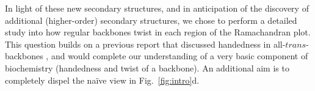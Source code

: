 \documentclass[fleqn,10pt]{wlpeerj} %
\newcommand{\Fig}[1]{Fig.~\ref{#1}}
\begin{document}
In light of these new secondary structures, and in anticipation of the discovery of additional (higher-order) secondary structures, we chose to perform a detailed study into how regular backbones twist in each region of the Ramachandran plot. This question builds on a previous report that discussed handedness in all-$trans$-backbones \citep{Zacharias2013}, and would complete our understanding of a very basic component of biochemistry (handedness and twist of a backbone). An additional aim is to completely dispel the na{\"i}ve view in \Fig{fig:intro}d.


\end{document}
